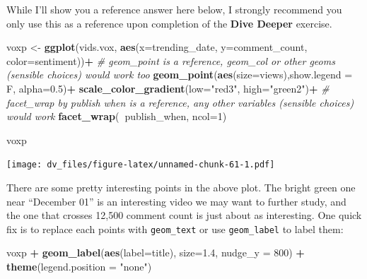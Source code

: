 \documentclass[]{article}
\newenvironment{Shaded}{\begin{snugshade}}{\end{snugshade}}
\newcommand{\CommentTok}[1]{\textcolor[rgb]{0.56,0.35,0.01}{\textit{#1}}}
\newcommand{\DataTypeTok}[1]{\textcolor[rgb]{0.13,0.29,0.53}{#1}}
\newcommand{\DecValTok}[1]{\textcolor[rgb]{0.00,0.00,0.81}{#1}}
\newcommand{\FloatTok}[1]{\textcolor[rgb]{0.00,0.00,0.81}{#1}}
\newcommand{\KeywordTok}[1]{\textcolor[rgb]{0.13,0.29,0.53}{\textbf{#1}}}
\newcommand{\NormalTok}[1]{#1}
\newcommand{\OperatorTok}[1]{\textcolor[rgb]{0.81,0.36,0.00}{\textbf{#1}}}
\newcommand{\StringTok}[1]{\textcolor[rgb]{0.31,0.60,0.02}{#1}}
\begin{document}
While I'll show you a reference answer here below, I strongly recommend
you only use this as a reference upon completion of the \textbf{Dive
Deeper} exercise.

\begin{Shaded}
\begin{Highlighting}[]
\NormalTok{voxp <-}\StringTok{ }\KeywordTok{ggplot}\NormalTok{(vids.vox, }\KeywordTok{aes}\NormalTok{(}\DataTypeTok{x=}\NormalTok{trending_date, }\DataTypeTok{y=}\NormalTok{comment_count, }\DataTypeTok{color=}\NormalTok{sentiment))}\OperatorTok{+}
\StringTok{  }\CommentTok{# geom_point is a reference, geom_col or other geoms (sensible choices) would work too }
\StringTok{  }\KeywordTok{geom_point}\NormalTok{(}\KeywordTok{aes}\NormalTok{(}\DataTypeTok{size=}\NormalTok{views),}\DataTypeTok{show.legend =}\NormalTok{ F, }\DataTypeTok{alpha=}\FloatTok{0.5}\NormalTok{)}\OperatorTok{+}
\StringTok{  }\KeywordTok{scale_color_gradient}\NormalTok{(}\DataTypeTok{low=}\StringTok{"red3"}\NormalTok{, }\DataTypeTok{high=}\StringTok{"green2"}\NormalTok{)}\OperatorTok{+}
\StringTok{  }\CommentTok{# facet_wrap by publish when is a reference, any other variables (sensible choices) would work}
\StringTok{  }\KeywordTok{facet_wrap}\NormalTok{(}\OperatorTok{~}\NormalTok{publish_when, }\DataTypeTok{ncol=}\DecValTok{1}\NormalTok{)}

\NormalTok{voxp}
\end{Highlighting}
\end{Shaded}

\texttt{[image: dv\_files/figure-latex/unnamed-chunk-61-1.pdf]}

There are some pretty interesting points in the above plot. The bright
green one near ``December 01'' is an interesting video we may want to
further study, and the one that crosses 12,500 comment count is just
about as interesting. One quick fix is to replace each points with
\texttt{geom\_text} or use \texttt{geom\_label} to label them:

\begin{Shaded}
\begin{Highlighting}[]
\NormalTok{voxp }\OperatorTok{+}\StringTok{ }
\StringTok{  }\KeywordTok{geom_label}\NormalTok{(}\KeywordTok{aes}\NormalTok{(}\DataTypeTok{label=}\NormalTok{title), }\DataTypeTok{size=}\FloatTok{1.4}\NormalTok{, }\DataTypeTok{nudge_y =} \DecValTok{800}\NormalTok{) }\OperatorTok{+}
\StringTok{  }\KeywordTok{theme}\NormalTok{(}\DataTypeTok{legend.position =} \StringTok{"none"}\NormalTok{)}
\end{Highlighting}
\end{Shaded}
\end{document}
